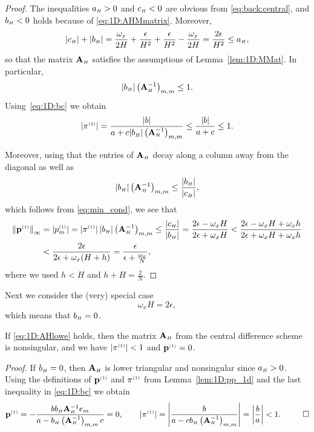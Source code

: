 \begin{proof}
The inequalities $a_{\scriptscriptstyle H}>0$ and $c_{\scriptscriptstyle H}<0$ are obvious from
\eqref{eq:back:central}, and $b_{\scriptscriptstyle H}<0$ holds because of \eqref{eq:1D:AHMmatrix}.
Moreover,
%
$$|c_{\scriptscriptstyle H}|+|b_{\scriptscriptstyle H}|=\frac{\omega_x}{2H}+\frac{\epsilon}{H^{2}}+
\frac{\epsilon}{H^{2}}-\frac{\omega_x}{2H}=\frac{2\epsilon}{H^{2}}\leq a_{\scriptscriptstyle H},$$
%
so that the matrix $\mathbf{A}_{\scriptscriptstyle H}$ satisfies the assumptions of Lemma~\ref{lem:1D:MMat}.
In particular,
%
$$|b_{\scriptscriptstyle H}|  \left(\mathbf{A}_{\scriptscriptstyle H} ^{-1}\right)_{m,m}\leq 1.$$
%
Using~\eqref{eq:1D:bc} we obtain
%
$$|\pi^{\scriptscriptstyle (1)}|=\frac{|b| }{a +c |b_{\scriptscriptstyle H}|
\left(\mathbf{A}_{\scriptscriptstyle H} ^{-1}\right)_{m,m}}
\leq\frac{|b| }{a + c}\leq 1.$$

Moreover, using that the entries of $\mathbf{A}_{\scriptscriptstyle H}$ decay along a column away from
the diagonal as well as
%
$$|b_{\scriptscriptstyle H}|  \left(\mathbf{A}_{\scriptscriptstyle H} ^{-1}\right)_{m,m}\leq
\frac{|b_{\scriptscriptstyle H}|}{|c_{\scriptscriptstyle H}|},$$
%
which follows from \eqref{eq:min_cond}, we see that
%
\begin{align*}
\left\Vert\mathbf{p}^{\scriptscriptstyle (1)}\right\Vert_\infty & =\left|p^{\scriptscriptstyle (1)}_{m}\right| = |\pi^{\scriptscriptstyle (1)}|\,
|b_{\scriptscriptstyle H}|  \left(\mathbf{A}_{\scriptscriptstyle H} ^{-1}\right)_{m,m}\leq
\frac{|c_{\scriptscriptstyle H}|}{|b_{\scriptscriptstyle H}|} =\frac{2\epsilon-\omega_x H}{2\epsilon+\omega_x H}
<\frac{2\epsilon-\omega_x H+\omega_x h}{2\epsilon+\omega_x H+\omega_x h}\\
 &<\frac{2\epsilon}{2\epsilon+\omega_x(H+h)}=\frac{\epsilon}{\epsilon+\frac{\omega_x}{N}},
\end{align*}
%
where we used $h<H$ and $h+H=\frac{2}{N}$.
\end{proof}

Next we consider the (very) special case
%
\begin{equation}\label{eq:1D:AHlowe}
\omega_x H=2\epsilon,
\end{equation}
%
which means that $b_{\scriptscriptstyle H}=0$.

\begin{lemma}\label{lem:p4}
If \eqref{eq:1D:AHlowe} holds, then the matrix $\mathbf{A}_{\scriptscriptstyle H}$ from the central
difference scheme is nonsingular, and we have $|\pi^{\scriptscriptstyle (1)}|<1$ and $\mathbf{p}^{\scriptscriptstyle (1)}=0$.
\end{lemma}

{\em Proof.}
If $b_{\scriptscriptstyle H}=0$, then $\mathbf{A}_{\scriptscriptstyle H}$ is lower triangular and nonsingular since
$a_{\scriptscriptstyle H}>0$. Using the definitions of $\mathbf{p}^{\scriptscriptstyle (1)}$ and $\pi^{\scriptscriptstyle (1)}$ from
Lemma~\ref{lem:1D:pp_1d} and the last inequality in \eqref{eq:1D:bc} we obtain
%
$$\mathbf{p}^{\scriptscriptstyle (1)}=-\frac{bb_{\scriptscriptstyle H} \mathbf{A}_{\scriptscriptstyle H}^{-1} e_m}{a-b_{\scriptscriptstyle H}\left(\mathbf{A}_{\scriptscriptstyle H}^{-1}\right)_{m,m}c}=0,\qquad
|\pi^{\scriptscriptstyle (1)}| = \left|\frac{b}{a-cb_{\scriptscriptstyle H}\left(\mathbf{A}_{\scriptscriptstyle H}^{-1}\right)_{m,m}}\right| =
\left|\frac{b}{a}\right|<1. ~~ \qed$$
%


